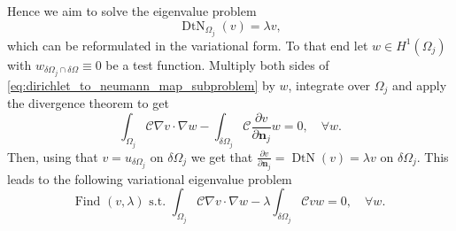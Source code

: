 Hence we aim to solve the eigenvalue problem
\[
  \operatorname{DtN}_{\Omega_j}\left(v\right) = \lambda v,
\]
which can be reformulated in the variational form. To that end let $w\in H^1(\Omega_j)$ with $w_{\delta\Omega_j\cap\delta\Omega} \equiv 0$ be a test function. Multiply both sides of \cref{eq:dirichlet_to_neumann_map_subproblem} by $w$, integrate over $\Omega_j$ and apply the divergence theorem to get
\[
  \int_{\Omega_j} \mathcal{C}\nabla v \cdot \nabla w - \int_{\delta\Omega_j} \mathcal{C}\frac{\partial v}{\partial \mathbf{n}_j}w = 0, \quad \forall w.
\]
Then, using that $v=u_{\delta\Omega_j}$ on $\delta\Omega_j$ we get that $\frac{\partial v}{\partial \mathbf{n}_j} = \operatorname{DtN}(v) = \lambda v $ on $\delta\Omega_j$. This leads to the following variational eigenvalue problem
\begin{equation}
  \text{Find } (v, \lambda) \text{ s.t. } \int_{\Omega_j} \mathcal{C}\nabla v \cdot \nabla w - \lambda \int_{\delta\Omega_j} \mathcal{C}vw = 0, \quad \forall w.
  \label{eq:dirichlet_to_neumann_map_eigenproblem}
\end{equation}

